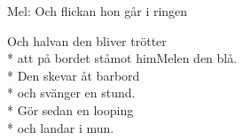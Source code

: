 \begin{SongText}[Flygarhalvan]
    \begin{SongInfo}
        Mel: Och flickan hon går i ringen
    \end{SongInfo}
    \begin{SongVerse}
        Och halvan den bliver trötter\\*%
        att på bordet ståmot himMelen den blå.\\*%
        Den skevar åt barbord\\*%
        och svänger en stund.\\*%
        Gör sedan en looping\\*%
        och landar i mun.
    \end{SongVerse}
\end{SongText}
